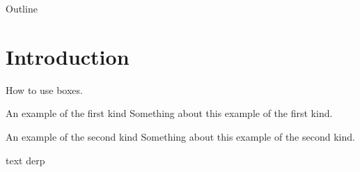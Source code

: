 


\begin{frame}
  \titlepage
\end{frame}

\begin{frame}{Outline}
  \tableofcontents
\end{frame}

\section{Introduction}

\begin{frame}{How to use boxes.}
\begin{block}{An example of the first kind}
  Something about this example of the first kind.
\end{block}
\begin{exampleblock}{An example of the second kind}
  Something about this example of the second kind.
\end{exampleblock}

\textcolor{ReneOrange}{text} derp

\end{frame}

 